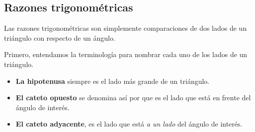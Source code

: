\subsection{Razones trigonométricas}

Las razones trigonométricas son simplemente comparaciones de dos lados 
de un triángulo con respecto de un ángulo.

Primero, entendamos la terminología para nombrar cada uno de los lados de un 
triángulo.


\begin{itemize}
	\item \textbf{La hipotenusa} siempre es el lado más grande de un triángulo.
	\item \textbf{El cateto opuesto} se denomina así por que es el lado que está 
		en frente del ángulo de interés.
	\item \textbf{El cateto adyacente}, es el lado que está \textit{a un lado}
		del ángulo de interés.
\end{itemize}